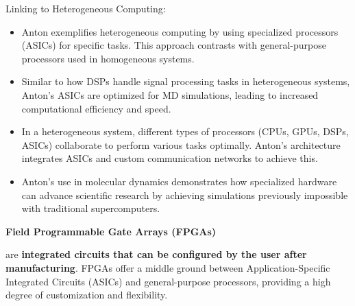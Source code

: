 \begin{examplebox}
    Linking to Heterogeneous Computing:
    \begin{itemize}
        \item Anton exemplifies heterogeneous computing by using specialized processors (ASICs) for specific tasks. This approach contrasts with general-purpose processors used in homogeneous systems.

        \item Similar to how DSPs handle signal processing tasks in heterogeneous systems, Anton's ASICs are optimized for MD simulations, leading to increased computational efficiency and speed.

        \item In a heterogeneous system, different types of processors (CPUs, GPUs, DSPs, ASICs) collaborate to perform various tasks optimally. Anton's architecture integrates ASICs and custom communication networks to achieve this.

        \item Anton's use in molecular dynamics demonstrates how specialized hardware can advance scientific research by achieving simulations previously impossible with traditional supercomputers.
    \end{itemize}
\end{examplebox}

\newpage

\begin{flushleft}
    \textcolor{Green3}{ \textbf{Field Programmable Gate Arrays (FPGAs)}}
\end{flushleft}
 are \textbf{integrated circuits that can be configured by the user after manufacturing}. FPGAs offer a middle ground between Application-Specific Integrated Circuits (ASICs) and general-purpose processors, providing a high degree of customization and flexibility.


